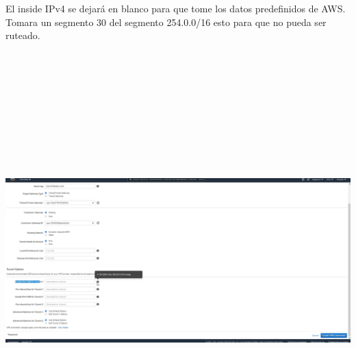 \documentclass{article} %
\begin{document}
\noindent 

\noindent 

\noindent 

\noindent 

\noindent 

\noindent 

\noindent 

\noindent 

\noindent 

\noindent El inside IPv4 se dejar\'{a} en blanco para que tome los datos predefinidos de AWS. Tomara un segmento 30 del segmento 254.0.0/16 esto para que no pueda ser ruteado. 

\noindent 

\noindent \includegraphics*[width=5.72in, height=6.34in, trim=0.00in 0.17in 7.83in 0.00in]{image22}

\noindent 

\noindent 

\noindent 
\end{document}
